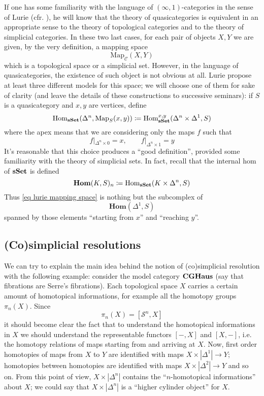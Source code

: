 \begin{refsection}
If one has some familiarity with the language of $(\infty,1)$-categories in the sense of Lurie (cfr. \cite{htt}), he will know that the theory of quasicategories is equivalent in an appropriate sense to the theory of topological categories and to the theory of simplicial categories. In these two last cases, for each pair of objects $X,Y$ we are given, by the very definition, a mapping space
\[
\mathrm{Map}_{\mathcal C}(X,Y)
\]
which is a topological space or a simplicial set. However, in the language of quasicategories, the existence of such object is not obvious at all. Lurie propose at least three different models for this space; we will choose one of them for sake of clarity (and leave the details of these constructions to successive seminars): if $S$ is a quasicategory and $x,y$ are vertices, define
\begin{equation} \label{eq lurie mapping space}
\mathrm{Hom}_{\mathbf{sSet}}(\Delta^n, \mathrm{Map}_S(x,y))\coloneqq \mathrm{Hom}_{\mathbf{sSet}}^{x,y}(\Delta^n \times \Delta^1, S)
\end{equation}
where the apex means that we are considering only the maps $f$ such that
\[
f |_{\Delta^n \times 0} = x, \qquad f |_{\Delta^n \times 1} = y
\]
It's reasonable that this choice produces a ``good definition'', provided some familiarity with the theory of simplicial sets. In fact, recall that the internal hom of $\mathbf{sSet}$ is defined
\[
\mathbf{Hom}(K,S)_n\coloneqq \mathrm{Hom}_{\mathbf{sSet}}(K \times \Delta^n, S)
\]
Thus \eqref{eq lurie mapping space} is nothing but the subcomplex of
\[
\mathbf{Hom}(\Delta^1,S)
\]
spanned by those elements ``starting from $x$'' and ``reaching $y$''.

\subsection{(Co)simplicial resolutions} \label{cosimplicial resolutions}

We can try to explain the main idea behind the notion of (co)simplicial resolution with the following example: consider the model category $\mathbf{CGHaus}$ (say that fibrations are Serre's fibrations). Each topological space $X$ carries a certain amount of homotopical informations, for example all the homotopy groups $\pi_n(X)$. Since
\[
\pi_n(X) = [\mathcal S^n, X]
\]
it should become clear the fact that to understand the homotopical informations in $X$ we should understand the representable functors $[-,X]$ and $[X,-]$, i.e. the homotopy relations of maps starting from and arriving at $X$. Now, first order homotopies of maps from $X$ to $Y$ are identified with maps $X \times |\Delta^1| \to Y$; homotopies between homotopies are identified with maps $X \times |\Delta^2| \to Y$ and so on. From this point of view, $X \times |\Delta^n|$ contains the ``$n$-homotopical informations'' about $X$; we could say that $X \times |\Delta^n|$ is a ``higher cylinder object'' for $X$.


\end{refsection}
